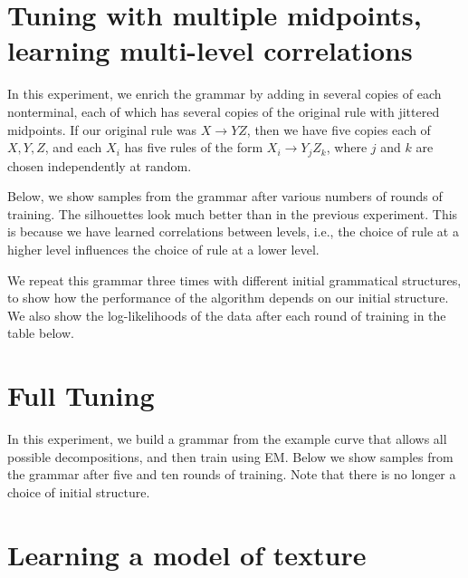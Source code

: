 \documentclass{book}
\begin{document}


\section{Tuning with multiple midpoints, learning multi-level correlations}

In this experiment, we enrich the grammar by adding in several copies
of each nonterminal, each of which has several copies of the original
rule with jittered midpoints. If our original rule was $X\to YZ$, then
we have five copies each of $X,Y,Z$, and each $X_i$ has five rules of
the form $X_i \to Y_j Z_k$, where $j$ and $k$ are chosen independently
at random.

Below, we show samples from the grammar after various numbers of
rounds of training. The silhouettes look much better than in the
previous experiment. This is because we have learned correlations
between levels, i.e., the choice of rule at a higher level influences
the choice of rule at a lower level.

We repeat this grammar three times with different initial grammatical
structures, to show how the performance of the algorithm depends on
our initial structure. We also show the log-likelihoods of the data
after each round of training in the table below.



\section{Full Tuning}

In this experiment, we build a grammar from the example curve that
allows all possible decompositions, and then train using EM. Below we
show samples from the grammar after five and ten rounds of
training. Note that there is no longer a choice of initial structure.



% 

\section{Learning a model of texture}
\end{document}
